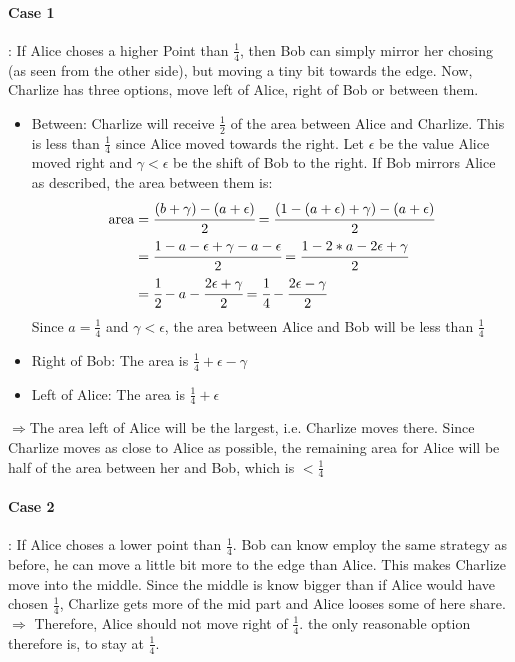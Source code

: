 \documentclass[11pt]{article}
\begin{document}
    \paragraph*{Case 1}: If Alice choses a higher Point than $\frac{1}{4}$, then Bob can simply mirror her chosing (as seen from the other side), but moving a tiny bit towards the edge.
    Now, Charlize has three options, move left of Alice, right of Bob or between them.\\
    \begin{itemize}
        \item Between: Charlize will receive $\frac{1}{2}$ of the area between Alice and Charlize. This is less than $\frac{1}{4}$ since Alice
        moved towards the right. Let $\epsilon$ be the value Alice moved right and $\gamma<\epsilon$ be the shift of Bob to the right. If Bob mirrors Alice as described,
        the area between them is: 
        \begin{equation*}
            \begin{split}
            \text{area}&=\cfrac{(b+\gamma)-(a+\epsilon)}{2}=\cfrac{(1-(a+\epsilon)+\gamma)-(a+\epsilon)}{2}\\
            &=\cfrac{1-a-\epsilon+\gamma-a-\epsilon}{2}=\cfrac{1-2*a-2\epsilon+\gamma}{2}\\
            &=\cfrac{1}{2}-a-\cfrac{2\epsilon+\gamma}{2}=\cfrac{1}{4}-\cfrac{2\epsilon-\gamma}{2}
            \end{split}
        \end{equation*}
        Since $a=\frac{1}{4}$ and $\gamma<\epsilon$, the area between Alice and Bob will be less than $\frac{1}{4}$
        \item Right of Bob: The area is $\frac{1}{4}+\epsilon-\gamma$ 
        \item Left of Alice: The area is $\frac{1}{4}+\epsilon$
    \end{itemize}
    $\Rightarrow$The area left of Alice will be the largest, i.e. Charlize moves there. Since Charlize moves as close to
    Alice as possible, the remaining area for Alice will be half of the area between her and Bob, which is $<\frac{1}{4}$
    
    \paragraph*{Case 2}: If Alice choses a lower point than $\frac{1}{4}$. Bob can know employ the same strategy as before,
    he can move a little bit more to the edge than Alice. This makes Charlize move into the middle. Since the middle is know
    bigger than if Alice would have chosen $\frac{1}{4}$, Charlize gets more of the mid part and Alice looses some of here share.
    $\Rightarrow$ Therefore, Alice should not move right of $\frac{1}{4}$. the only reasonable option therefore is, to stay at
    $\frac{1}{4}$.
\end{document}
